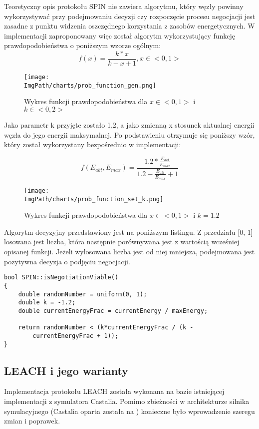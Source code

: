 Teoretyczny opis protokołu SPIN nie zawiera algorytmu, który węzły powinny wykorzystywać przy podejmowaniu decyzji czy rozpoczęcie procesu negocjacji jest zasadne z punktu widzenia oszczędnego korzystania z zasobów energetycznych. W implementacji zaproponowany więc został algorytm wykorzystujący funkcję prawdopodobieństwa o poniższym wzorze ogólnym:
\[
	f(x) = \frac{k*x}{k - x + 1}, x \in <0, 1>
\]

\begin{figure}[H]
	\begin{center}
		\texttt{[image: \\ImgPath/charts/prob\_function\_gen.png]}
	\end{center}
	\caption{Wykres funkcji prawdopodobieństwa dla $x \in <0, 1>$ i $k \in <0, 2>$}
\end{figure}

Jako parametr k przyjęte zostało 1,2, a jako zmienną x stosunek aktualnej energii węzła do jego energii maksymalnej. Po podstawieniu otrzymuje się poniższy wzór, który został wykorzystany bezpośrednio w implementacji: 

\[
	f(E_{akt}, E_{max}) = \frac{1.2 * \frac{E_{akt}}{E_{max}}}{1.2 - \frac{E_{akt}}{E_{max}} + 1}
\]

\begin{figure}[H]
	\begin{center}
		\texttt{[image: \\ImgPath/charts/prob\_function\_set\_k.png]}
	\end{center}
	\caption{Wykres funkcji prawdopodobieństwa dla $x \in <0, 1>$ i $k = 1.2$}
\end{figure}
Algorytm decyzyjny przedstawiony jest na poniższym listingu. Z przedziału [0, 1] losowana jest liczba, która następnie porównywana jest z wartością wcześniej opisanej funkcji. Jeżeli wylosowana liczba jest od niej mniejsza, podejmowana jest pozytywna decyzja o podjęciu negocjacji.
\begin{verbatim}
bool SPIN::isNegotiationViable()
{
    double randomNumber = uniform(0, 1);
    double k = -1.2;
    double currentEnergyFrac = currentEnergy / maxEnergy;

    return randomNumber < (k*currentEnergyFrac / (k -
        currentEnergyFrac + 1));
}
\end{verbatim}
\subsection{LEACH i jego warianty}
Implementacja protokołu LEACH została wykonana na bazie istniejącej implementacji z symulatora Castalia. Pomimo zbieżności w architekturze silnika
symulacyjnego (Castalia oparta została na \omnetpp) konieczne było wprowadzenie szeregu zmian i poprawek.


